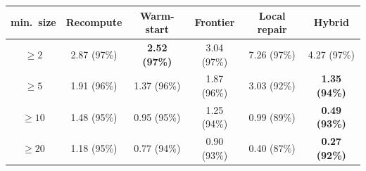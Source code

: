 \begin{tabular}{c ccccc}
\toprule
min.\ size & Recompute & Warm-start & Frontier & Local repair & Hybrid\\
\midrule
$\geq 2$ & 2.87 (97\%) & \textbf{2.52 (97\%)} & 3.04 (97\%) & 7.26 (97\%) & 4.27 (97\%) \\
$\geq 5$ & 1.91 (96\%) & 1.37 (96\%) & 1.87 (96\%) & 3.03 (92\%) & \textbf{1.35 (94\%)} \\
$\geq 10$ & 1.48 (95\%) & 0.95 (95\%) & 1.25 (94\%) & 0.99 (89\%) & \textbf{0.49 (93\%)} \\
$\geq 20$ & 1.18 (95\%) & 0.77 (94\%) & 0.90 (93\%) & 0.40 (87\%) & \textbf{0.27 (92\%)} \\
\bottomrule
\end{tabular}
